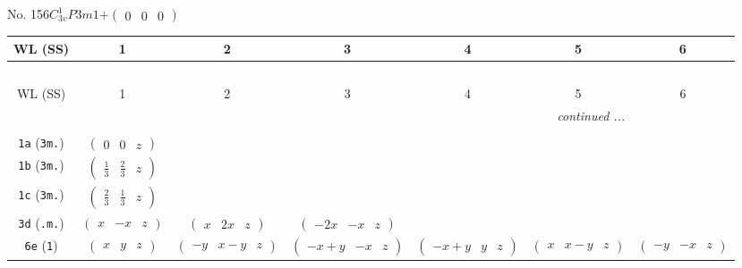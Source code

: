\documentclass[fleqn,9pt,landscape]{jsarticle}
\begin{document}
\newpage
No. 156\quad$C_{3v}^{1}$\quad$P3m1$\quad[ trigonal ]\quad$+\begin{pmatrix} 0 & 0 & 0 \end{pmatrix}$
\begin{center}
\renewcommand{\arraystretch}{1.2}
\begin{longtable}{ccccccc}
 \hline \hline
WL (SS) & 1 & 2 & 3 & 4 & 5 & 6 \\ \hline \endfirsthead

\multicolumn{6}{l}{\tablename\ \thetable{}} \\
 \hline \hline
WL (SS) & 1 & 2 & 3 & 4 & 5 & 6 \\ \hline \endhead

 \hline \hline
\multicolumn{6}{r}{\footnotesize\it continued ...} \\ \endfoot

 \hline \hline
\multicolumn{6}{r}{} \\ \endlastfoot

{\tt 1a} ({\tt 3m.}) & $ \begin{pmatrix} 0 & 0 & z \end{pmatrix} $ & $  $ & $  $ & $  $ & $  $ & $  $ \\ \hline
{\tt 1b} ({\tt 3m.}) & $ \begin{pmatrix} \frac{1}{3} & \frac{2}{3} & z \end{pmatrix} $ & $  $ & $  $ & $  $ & $  $ & $  $ \\ \hline
{\tt 1c} ({\tt 3m.}) & $ \begin{pmatrix} \frac{2}{3} & \frac{1}{3} & z \end{pmatrix} $ & $  $ & $  $ & $  $ & $  $ & $  $ \\ \hline
{\tt 3d} ({\tt .m.}) & $ \begin{pmatrix} x & - x & z \end{pmatrix} $ & $ \begin{pmatrix} x & 2 x & z \end{pmatrix} $ & $ \begin{pmatrix} - 2 x & - x & z \end{pmatrix} $ & $  $ & $  $ & $  $ \\ \hline
{\tt 6e} ({\tt 1}) & $ \begin{pmatrix} x & y & z \end{pmatrix} $ & $ \begin{pmatrix} - y & x - y & z \end{pmatrix} $ & $ \begin{pmatrix} - x + y & - x & z \end{pmatrix} $ & $ \begin{pmatrix} - x + y & y & z \end{pmatrix} $ & $ \begin{pmatrix} x & x - y & z \end{pmatrix} $ & $ \begin{pmatrix} - y & - x & z \end{pmatrix} $ \\
\end{longtable}
\end{center}
\end{document}
